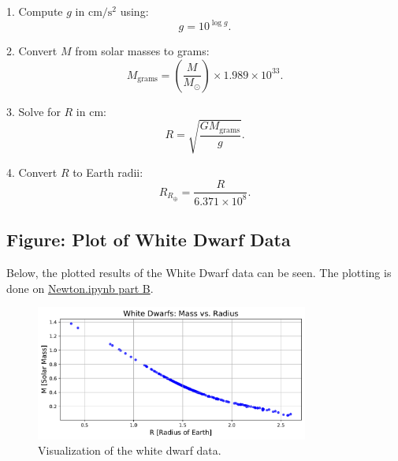 \documentclass[12pt]{article}
\begin{document}
1. Compute \(g\) in \(\mathrm{cm/s^2}\) using:
   \[
   g = 10^{\log g}.
   \]

2. Convert \(M\) from solar masses to grams:
   \[
   M_{\mathrm{grams}} = \left(\frac{M}{M_\odot}\right) \times 1.989 \times 10^{33}.
   \]

3. Solve for \(R\) in \(\mathrm{cm}\):
   \[
   R = \sqrt{\frac{G M_{\mathrm{grams}}}{g}}.
   \]

4. Convert \(R\) to Earth radii:
   \[
   R_{R_\oplus} = \frac{R}{6.371 \times 10^8}.
   \]

\subsection{Figure: Plot of White Dwarf Data}

Below, the plotted results of the White Dwarf data can be seen. The plotting is done on \href{Newton.ipynb}{Newton.ipynb part B}.

\begin{figure}[h!]
    \centering
    \includegraphics[width=0.8\textwidth]{Newton_PartB_WhiteDwarfDataFitting.pdf}
    \caption{Visualization of the white dwarf data.}
    \label{fig:newtonian-visualization}
\end{figure}

   
\end{document}
